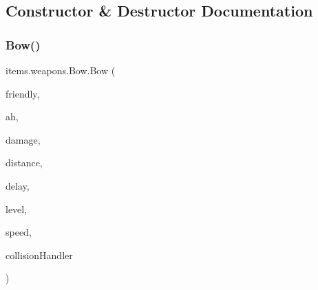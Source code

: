 \subsection{Constructor \& Destructor Documentation}
\mbox{\label{classitems_1_1weapons_1_1_bow_a9534e58ec2be5748c6dce306686b81ca}} 
\subsubsection{\texorpdfstring{Bow()}{Bow()}}
{\footnotesize\ttfamily items.\+weapons.\+Bow.\+Bow (\begin{DoxyParamCaption}\item[{Class}]{friendly,  }\item[{\mbox{\hyperlink{classitems_1_1weapons_1_1_arrow_handler}{Arrow\+Handler}}}]{ah,  }\item[{int}]{damage,  }\item[{int}]{distance,  }\item[{int}]{delay,  }\item[{int}]{level,  }\item[{float}]{speed,  }\item[{\mbox{\hyperlink{classentities_1_1_collision_handler}{Collision\+Handler}}}]{collision\+Handler }\end{DoxyParamCaption})\hspace{0.3cm}{\ttfamily [inline]}}


